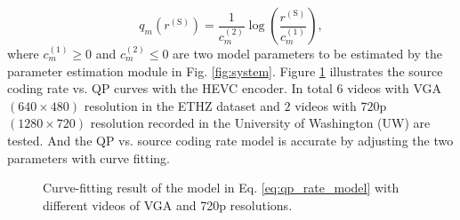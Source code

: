 \documentclass[journal]{IEEEtran}
\begin{document}
\begin{equation}\label{eq:qp_rate_model}
q_m\left(r^{\left(\text{S}\right)}\right) = \frac{1}{c_m^{\left(2\right)} }\log\left(\frac{r^{\left(\text{S}\right)}}{c_m^{\left(1\right)} }\right),
\end{equation}
where $c_m^{\left(1\right)} \geq 0$ and $c_m^{\left(2\right)} \leq 0$ are two model parameters to be estimated by the parameter estimation module in Fig. \ref{fig:system}. Figure \ref{fig:qp_rate_model} illustrates the source coding rate vs. QP curves with the HEVC encoder. In total $6$ videos with VGA $\left(640\times 480\right)$ resolution in the ETHZ dataset \cite{ELSG08} and $2$ videos with $720$p $\left(1280\times 720\right)$ resolution recorded in the University of Washington (UW) are tested. And the QP vs. source coding rate model is accurate by adjusting the two parameters with curve fitting. 

\begin{figure}[t]
\caption{Curve-fitting result of the model in Eq. \eqref{eq:qp_rate_model} with different videos of VGA and 720p resolutions.}\label{fig:qp_rate_model}
\end{figure}
\end{document}
